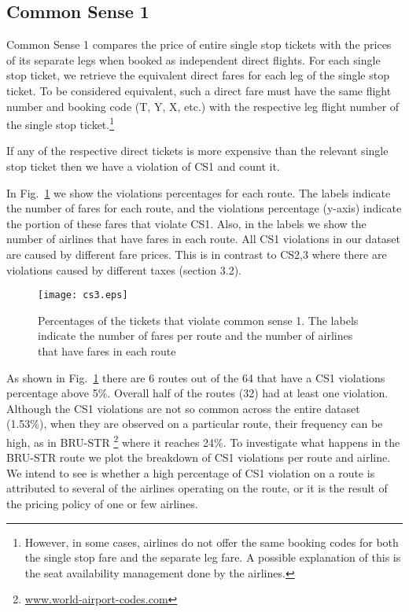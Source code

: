 

\subsection{Common Sense 1}
\label{subsec:cs1}
Common Sense 1 compares the price of entire single stop tickets with the prices 
of its separate legs when booked as independent direct flights. 
For each single stop ticket, we retrieve the equivalent direct fares for each leg 
of the single stop ticket. 
To be considered equivalent, such a direct fare must have the same flight number 
and booking code (T, Y, X, etc.) with the respective leg flight number of the 
single stop ticket.\footnote{However, in some cases, airlines do not offer the same booking codes for 
both the single stop fare and the separate leg fare. 
A possible explanation of this is the seat availability management done by the airlines.}

If any of the respective direct tickets  is more expensive than the relevant 
single stop ticket then we have a violation of CS1 and count it. 

In Fig.~\ref{fig:cs1Violations} we show the violations percentages for each route. 
The labels indicate the number of fares for each route, and the violations percentage
(y-axis) indicate the portion of these fares that violate CS1. Also, 
in the labels we show the number of airlines that have fares in each route.
All CS1 violations in our dataset are caused by different fare prices. This
is in contrast to CS2,3 where there are violations caused by different taxes 
(section 3.2).

\begin{figure}[H]
\centering
\texttt{[image: cs3.eps]}
\caption{Percentages of the tickets that violate common sense 1. 
The labels indicate the number of fares per route and the number of airlines that 
have fares in each route}
\label{fig:cs1Violations}
\end{figure}

As shown in Fig.~\ref{fig:cs1Violations} there are 6 routes out of the 64 that 
have a CS1 violations percentage above 5\%. Overall half of the routes (32) 
had at least one violation. 
Although the CS1 violations are not so common across the entire dataset (1.53\%), when 
they are observed on a particular route, their frequency can be high, as in 
BRU-STR \footnote{\url{www.world-airport-codes.com}} where it reaches 24\%. 
To investigate what happens in the BRU-STR route 
we plot the breakdown of CS1 violations per route and airline. 
We intend to see is whether a high percentage of CS1 violation on a route is 
attributed to several of the airlines operating on the route, or it is the 
result of the pricing policy of one or few airlines. 

